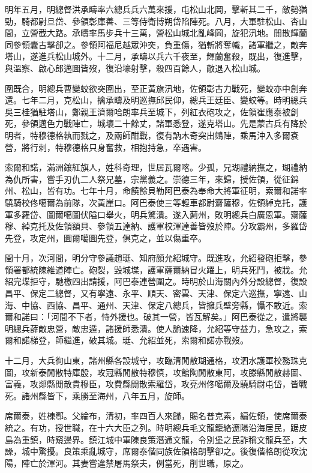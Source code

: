 \begin{pinyinscope}
明年五月，明總督洪承疇率六總兵兵六萬來援，屯松山北岡，擊斬其二千，敵勢猶勁，騎都尉旦岱、參領彰庫善、三等侍衛博朔岱陷陣死。八月，大軍駐松山、杏山間，立營截大路。承疇率馬步兵十三萬，營松山城北亂峰岡，旋犯汛地。閒散輝蘭同參領囊古擊卻之。參領阿福尼越眾沖突，負重傷，猶斬將奪幟，諸軍繼之，敵奔塔山，遂進兵松山城外。十二月，承疇以兵六千夜至，輝蘭奮殺，既出，復進擊，與溫察、啟心郎邁圖皆歿，復沿壕射擊，殺四百餘人，敵退入松山城。

圍既合，明總兵曹變蛟欲突圍出，至正黃旗汛地，佐領彰古力戰死，變蛟亦中創奔還。七年二月，克松山，擒承疇及明巡撫邱民仰，總兵王廷臣、變蛟等。時明總兵吳三桂猶駐塔山，鄭親王濟爾哈朗率兵至城下，列紅衣砲攻之，佐領崔應泰被創死，參領邁色力戰陣亡，城壞二十餘丈，諸軍悉登，遂克塔山。先是蒙古兵有降於明者，特穆德格執而戮之，及兩師酣戰，復有訥木奇突出鵕陣，乘馬沖入多爾袞營，將行刺，特穆德格只身奮救，相抱持急，卒遇害。

索爾和諾，滿洲鑲紅旗人，姓科奇理，世居瓦爾喀。少孤，兄瑚禮納撫之，瑚禮納為仇所害，嘗手刃仇二人祭兄墓，宗黨義之。崇德三年，來歸，授佐領，從征錦州、松山，皆有功。七年十月，命饒餘貝勒阿巴泰為奉命大將軍征明，索爾和諾率驍騎校佟噶爾為前隊，次黃崖口。阿巴泰使三等輕車都尉齋薩穆，佐領綽克托，護軍多羅岱、圖爾噶圖伏隘口舉火，明兵驚潰。遂入薊州，敗明總兵白廣恩軍。齋薩穆、綽克托及佐領額貝、參領五達納、護軍校渾達善皆歿於陣。分攻霸州，多羅岱先登，攻定州，圖爾噶圖先登，俱克之，並以傷重卒。

閏十月，次河間，明分守參議趙珽、知府顏允紹城守。既進攻，允紹發砲拒擊，參領署都統陳維道陣亡。砲裂，毀城堞，護軍薩爾納冒火躍上，明兵死鬥，被戕。允紹完堞拒守，馳檄四出請援，阿巴泰連營圍之。時明於山海關內外分設總督，復設昌平、保定二總督，又有寧遠、永平、順天、密雲、天津、保定六巡撫，寧遠、山海、中協、西協、昌平、通州、天津、保定八總兵，皆擁兵壁旁縣，懾不敢近。索爾和諾曰：「河間不下者，恃外援也。破其一營，皆瓦解矣。」阿巴泰從之，遣將襲明總兵薛敵忠營，敵忠遁，諸援師悉潰。使人諭速降，允紹等守益力，急攻之，索爾和諾梯登，師繼進，破其城。珽、允紹並死，索爾和諾亦戰歿。

十二月，大兵徇山東，諸州縣各設城守，攻臨清閒散瑚通格，攻泗水護軍校務珠克圖，攻新泰閒散特庫殷，攻冠縣閒散特穆慎，攻館陶閒散東阿，攻滕縣閒散赫圖、富義，攻郯縣閒散貴穆臣，攻費縣閒散索羅岱，攻兗州佟噶爾及驍騎尉屯岱，皆戰死。諸州縣皆下，乘勝至海州，八年五月，旋師。

席爾泰，姓棟鄂。父綸布，清初，率四百人來歸，賜名普克素，編佐領，使席爾泰統之。有功，授世職，在十六大臣之列。時明總兵毛文龍籠絡遼陽沿海居民，踞皮島為重鎮，時窺邊界。鎮江城中軍陳良策潛通文龍，令別堡之民詐稱文龍兵至，大譟，城中驚擾。良策乘亂城守，席爾泰偕同族佐領格朗擊卻之。後復偕格朗從攻沈陽，陣亡於渾河。其妻嘗違禁屠馬祭夫，例當死，削世職，原之。


\end{pinyinscope}
